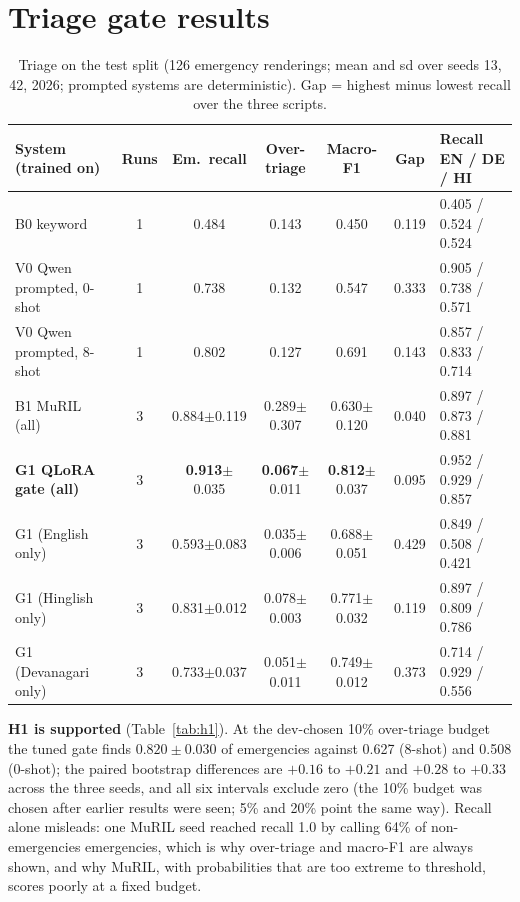 \documentclass[10pt,a4paper]{article}
\newcommand{\pmsd}[2]{#1{\scriptsize$\pm$#2}}
\begin{document}
\section{Triage gate results}
\begin{table}[t]
\centering\small
\begin{tabularx}{\textwidth}{@{}l c c c c c Y@{}}
\toprule
System (trained on) & Runs & Em.\ recall & Over-triage & Macro-F1 & Gap & Recall EN / DE / HI\\
\midrule
B0 keyword & 1 & 0.484 & 0.143 & 0.450 & 0.119 & 0.405 / 0.524 / 0.524\\
V0 Qwen prompted, 0-shot & 1 & 0.738 & 0.132 & 0.547 & 0.333 & 0.905 / 0.738 / 0.571\\
V0 Qwen prompted, 8-shot & 1 & 0.802 & 0.127 & 0.691 & 0.143 & 0.857 / 0.833 / 0.714\\
B1 MuRIL~\cite{muril} (all) & 3 & \pmsd{0.884}{0.119} & \pmsd{0.289}{0.307} & \pmsd{0.630}{0.120} & 0.040 & 0.897 / 0.873 / 0.881\\
\textbf{G1 QLoRA gate (all)} & 3 & \pmsd{\textbf{0.913}}{0.035} & \pmsd{\textbf{0.067}}{0.011} & \pmsd{\textbf{0.812}}{0.037} & 0.095 & 0.952 / 0.929 / 0.857\\
G1 (English only) & 3 & \pmsd{0.593}{0.083} & \pmsd{0.035}{0.006} & \pmsd{0.688}{0.051} & 0.429 & 0.849 / 0.508 / 0.421\\
G1 (Hinglish only) & 3 & \pmsd{0.831}{0.012} & \pmsd{0.078}{0.003} & \pmsd{0.771}{0.032} & 0.119 & 0.897 / 0.809 / 0.786\\
G1 (Devanagari only) & 3 & \pmsd{0.733}{0.037} & \pmsd{0.051}{0.011} & \pmsd{0.749}{0.012} & 0.373 & 0.714 / 0.929 / 0.556\\
\bottomrule
\end{tabularx}
\caption{Triage on the test split (126 emergency renderings; mean and sd over seeds 13, 42, 2026; prompted systems are deterministic). Gap = highest minus lowest recall over the three scripts.}
\label{tab:triage}
\end{table}

\textbf{H1 is supported} (Table~\ref{tab:h1}). At the dev-chosen 10\% over-triage budget the tuned gate finds $0.820\pm0.030$ of emergencies against 0.627 (8-shot) and 0.508 (0-shot); the paired bootstrap differences are $+0.16$ to $+0.21$ and $+0.28$ to $+0.33$ across the three seeds, and all six intervals exclude zero (the 10\% budget was chosen after earlier results were seen; 5\% and 20\% point the same way). Recall alone misleads: one MuRIL seed reached recall 1.0 by calling 64\% of non-emergencies emergencies, which is why over-triage and macro-F1 are always shown, and why MuRIL, with probabilities that are too extreme to threshold, scores poorly at a fixed budget.
\end{document}
